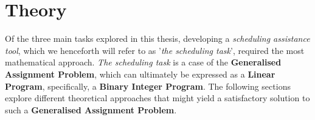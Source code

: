 \section{Theory}
Of the three main tasks explored in this thesis, developing a \textit{scheduling assistance tool}, which we henceforth will refer to as '\textit{the scheduling task}', required the most mathematical approach. \textit{The scheduling task} is a case of the \textbf{Generalised Assignment Problem}\cite{Wiki-general-assignment-prob}, which can ultimately be expressed as a \textbf{Linear Program}\cite{Wiki-linear-programming}, specifically, a \textbf{Binary Integer Program}.
The following sections explore different theoretical approaches that might yield a satisfactory solution to such a \textbf{Generalised Assignment Problem}.





